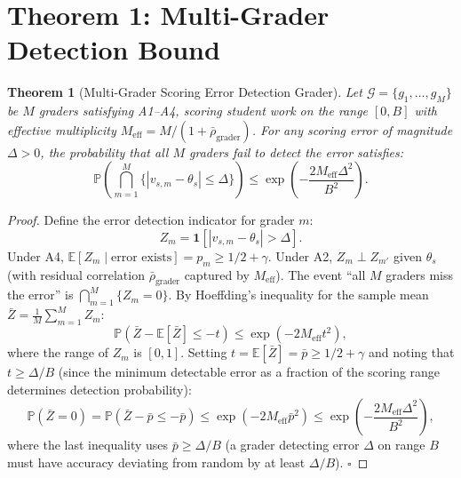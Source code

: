 \documentclass[11pt,a4paper]{article}
\newtheorem{theorem}{Theorem}[section]
\theoremstyle{definition}
\theoremstyle{remark}
\newcommand{\E}{\mathbb{E}}
\newcommand{\Pbb}{\mathbb{P}}
\newcommand{\ind}[1]{\mathbf{1}[#1]}
\newcommand{\cG}{\mathcal{G}}
\newcommand{\trueScore}{\theta}
\begin{document}
\section{Theorem 1: Multi-Grader Detection Bound}
\label{sec:theorem1}
\begin{theorem}[Multi-Grader Scoring Error Detection Grader]
\label{thm:detection}
Let $\cG = \{g_1, \ldots, g_M\}$ be $M$ graders satisfying A1--A4, scoring student work on the range $[0, B]$ with effective multiplicity $M_{\text{eff}} = M/(1 + \bar{\rho}_{\text{grader}})$. For any scoring error of magnitude $\Delta > 0$, the probability that all $M$ graders fail to detect the error satisfies:
\begin{equation}
    \Pbb\left(\bigcap_{m=1}^M \{|v_{s,m} - \trueScore_s| \le \Delta\}\right) \le \exp\left(-\frac{2 M_{\text{eff}} \Delta^2}{B^2}\right).
    \label{eq:detection_bound}
\end{equation}
\end{theorem}
\begin{proof}
Define the error detection indicator for grader $m$:
\begin{equation}
    Z_m = \ind{|v_{s,m} - \trueScore_s| > \Delta}.
\end{equation}
Under A4, $\E[Z_m \mid \text{error exists}] = p_m \ge 1/2 + \gamma$. Under A2, $Z_m \perp Z_{m'}$ given $\trueScore_s$ (with residual correlation $\bar{\rho}_{\text{grader}}$ captured by $M_{\text{eff}}$).
The event ``all $M$ graders miss the error'' is $\bigcap_{m=1}^M \{Z_m = 0\}$. By Hoeffding's inequality for the sample mean $\bar{Z} = \frac{1}{M}\sum_{m=1}^M Z_m$:
\begin{equation}
    \Pbb(\bar{Z} - \E[\bar{Z}] \le -t) \le \exp(-2 M_{\text{eff}} t^2),
\end{equation}
where the range of $Z_m$ is $[0,1]$. Setting $t = \E[\bar{Z}] = \bar{p} \ge 1/2 + \gamma$ and noting that $t \ge \Delta/B$ (since the minimum detectable error as a fraction of the scoring range determines detection probability):
\begin{equation}
    \Pbb(\bar{Z} = 0) = \Pbb(\bar{Z} - \bar{p} \le -\bar{p}) \le \exp(-2 M_{\text{eff}} \bar{p}^2) \le \exp\left(-\frac{2 M_{\text{eff}} \Delta^2}{B^2}\right),
\end{equation}
where the last inequality uses $\bar{p} \ge \Delta/B$ (a grader detecting error $\Delta$ on range $B$ must have accuracy deviating from random by at least $\Delta/B$). \hfill $\square$
\end{proof}
\end{document}
